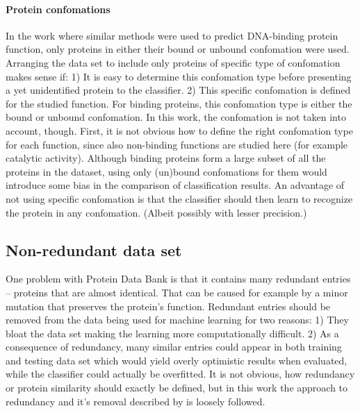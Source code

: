 \documentclass[11pt,twoside,a4paper]{book}
\begin{document}
\paragraph{Protein confomations} In the work \cite{szabova} where similar methods were used to predict DNA-binding protein 
function, only proteins in either their bound or unbound confomation were used.
Arranging the data set to include only proteins of specific type of
confomation makes sense if: 1) It is easy to determine this confomation type 
before presenting a yet unidentified protein to the classifier. 
2) This specific confomation is defined for the studied function.
For binding proteins, this confomation type is either the bound
or unbound confomation.
In this work, the confomation is not taken into account, though.
First, it is not obvious how to define the right confomation
type for each function, since also non-binding functions
are studied here (for example catalytic activity).
Although binding proteins form a large subset of all the proteins
in the dataset, using only (un)bound confomations  for them  would introduce
some bias in the comparison of classification results.
An advantage of not using specific confomation is that 
the classifier should then learn to recognize 
the protein in any confomation.
(Albeit possibly with lesser precision.) 

\subsection{Non-redundant data set}
\label{ssec:redundancy}
One problem with Protein Data Bank is that it contains many redundant entries --
proteins that are almost identical.
That can be caused for example by a minor mutation that preserves the protein's function.
Redundant entries should be removed from the data being used for machine learning for two reasons:
1) They bloat the data set making the learning more computationally difficult.
2) As a consequence of redundancy, many similar entries could appear in both training and testing data set
which would yield overly optimistic results when evaluated, 
while the classifier could actually be overfitted.
It is not obvious, how redundancy or protein similarity should exactly be defined,
but in this work the approach to redundancy and it's removal described by \cite{maxind} is loosely followed.
\end{document}
